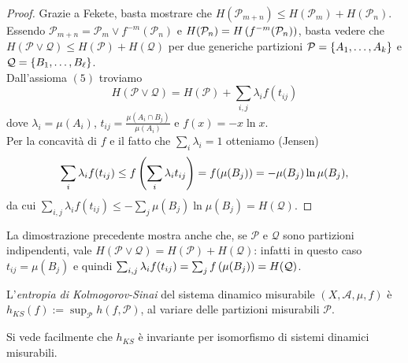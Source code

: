 \begin{proof}Grazie a Fekete, basta mostrare che $H(\mathcal{P}_{m+n})\le H(\mathcal{P}_m)+H(\mathcal{P}_n)$.
Essendo $\mathcal{P}_{m+n}=\mathcal{P}_m\vee f^{-m}(\mathcal{P}_n)$ e $H(\mathcal{P}_n)=H\left(f^{-m}(\mathcal{P}_n)\right)$,
basta vedere che $H(\mathcal{P}\vee\mathcal{Q})\le H(\mathcal{P})+H(\mathcal{Q})$ per due generiche
partizioni $\mathcal{P}=\left\{A_1,\dots,A_k\right\}$ e $\mathcal{Q}=\left\{B_1,\dots,B_\ell\right\}$. \\
Dall'assioma $(5)$ troviamo
\[ H(\mathcal{P}\vee\mathcal{Q})=H(\mathcal{P})+\sum_{i,j}\lambda_i f(t_{ij}) \]
dove $\lambda_i=\mu(A_i)$, $t_{ij}=\frac{\mu(A_i\cap B_j)}{\mu(A_i)}$ e $f(x)=-x\ln x$. \\
Per la concavità di $f$ e il fatto che $\sum_i\lambda_i=1$ otteniamo (Jensen)
\[ \sum_i \lambda_i f(t_{ij})\le f\left(\sum_i\lambda_i t_{ij}\right)=f(\mu(B_j))=-\mu(B_j)\ln\mu(B_j), \]
da cui $\sum_{i,j}\lambda_i f(t_{ij})\le -\sum_j \mu(B_j)\ln\mu(B_j)=H(\mathcal{Q})$.
\end{proof}

\begin{oss}La dimostrazione precedente mostra anche che, se $\mathcal{P}$ e $\mathcal{Q}$ sono partizioni indipendenti,
vale $H(\mathcal{P}\vee\mathcal{Q})=H(\mathcal{P})+H(\mathcal{Q})$: infatti in questo caso $t_{ij}=\mu(B_j)$
e quindi $\sum_{i,j}\lambda_i f(t_{ij})=\sum_j f\left(\mu(B_j)\right)=H(\mathcal{Q})$.
\end{oss}

\begin{defi}L'\emph{entropia di Kolmogorov-Sinai} del sistema dinamico misurabile $(X,\mathcal{A},\mu,f)$ è
$h_{KS}(f):=\sup_{\mathcal{P}}h(f,\mathcal{P})$, al variare delle partizioni misurabili $\mathcal{P}$.
\end{defi}

\begin{oss}Si vede facilmente che $h_{KS}$ è invariante per isomorfismo di sistemi dinamici misurabili.
\end{oss}

